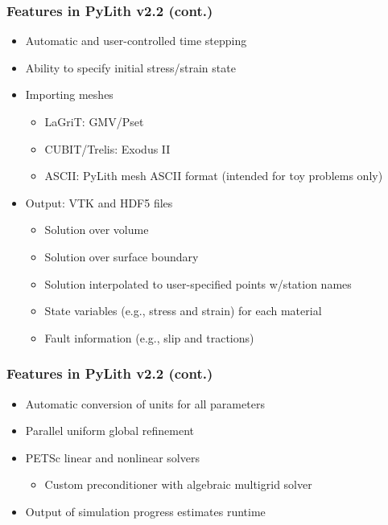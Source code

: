 \documentclass[aspectratio=169,hyperref=colorlinks]{beamer}
\begin{document}
\begin{frame}
  \frametitle{Features in PyLith v2.2 (cont.)}
  \summary{}

  \begin{itemize}
  \item Automatic and user-controlled time stepping
  \item Ability to specify initial stress/strain state
  \item Importing meshes
    \begin{itemize}
    \item LaGriT: GMV/Pset
    \item CUBIT/Trelis: Exodus II
    \item ASCII: PyLith mesh ASCII format (intended for toy problems only)
    \end{itemize}
  \item Output: VTK and HDF5 files
    \begin{itemize}
    \item Solution over volume
    \item Solution over surface boundary
    \item Solution interpolated to user-specified points w/station names
    \item State variables (e.g., stress and strain) for each material
    \item Fault information (e.g., slip and tractions)
    \end{itemize}
 \end{itemize}
  
\end{frame}


\begin{frame}
  \frametitle{Features in PyLith v2.2 (cont.)}
  \summary{}

  \begin{itemize}
  \item Automatic conversion of units for all parameters
  \item Parallel uniform global refinement
  \item PETSc linear and nonlinear solvers
    \begin{itemize}
    \item Custom preconditioner with algebraic multigrid solver
    \end{itemize}
  \item Output of simulation progress estimates runtime
 \end{itemize}
  
\end{frame}
\end{document}
